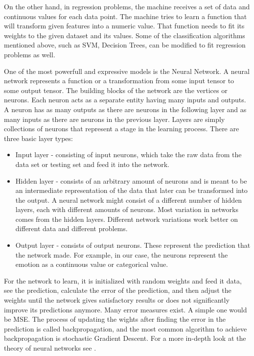 \documentclass[../main.tex]{subfiles}
\begin{document}
On the other hand, in regression problems, the machine receives a set of data and continuous values for 
each data point. The machine tries to learn a function that will transform given features into a 
numeric value. That function needs to fit its weights to the given dataset and its values. 
Some of the classification algorithms mentioned above, such as SVM, Decision Trees, can be 
modified to fit regression problems as well.

One of the most powerfull and expressive models is the Neural Network. 
A neural network represents a function or a transformation from some input tensor to some output tensor.
The building blocks of the network are the vertices or neurons. Each neuron acts as a separate entity having many inputs and outputs.
A neuron has as many outputs as there are neurons in the following layer and as many inputs as there are neurons in the previous layer.
Layers are simply collections of neurons that represent a stage in the learning process. There are three basic layer types:

\begin{samepage}
\begin{itemize}
    \item Input layer - consisting of input neurons, which take the raw data from the data set or testing set and feed it into the network.
    \item Hidden layer - consists of an arbitrary amount of neurons and is meant to be an intermediate representation of the data that
        later can be transformed into the output. A neural network might consist of a different number of hidden layers,
        each with different amounts of neurons. Most variation in networks comes from the hidden layers.
        Different network variations work better on different data and different problems.
    \item Output layer - consists of output neurons. These represent the prediction that the network made.
        For example, in our case, the neurons represent the emotion as a continuous value or categorical value.
\end{itemize}
\end{samepage}

For the network to learn, it is initialized with random weights and feed it data, see the prediction, calculate the error of the prediction,
and then adjust the weights until the network gives satisfactory results or does not significantly improve its predictions anymore.
Many error measures exist. A simple one would be MSE. The process of updating the wights after finding the error in the prediction
is called backpropagation, and the most common algorithm to achieve backpropagation is stochastic Gradient Descent.
For a more in-depth look at the theory of neural networks see \cite{nnbook1995}.
\par
\end{document}

